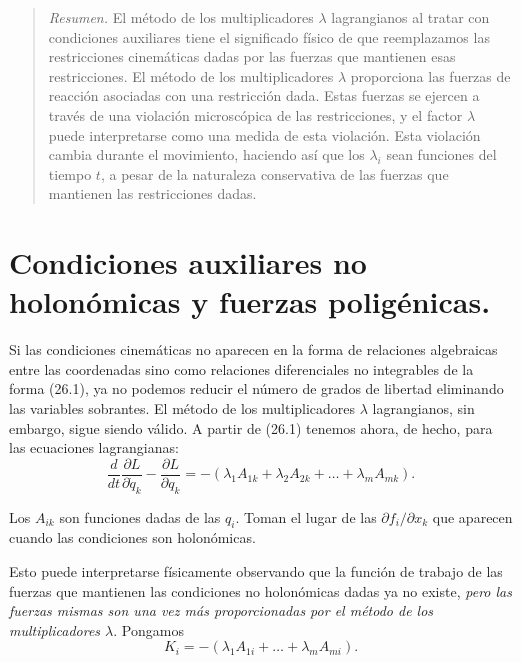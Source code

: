 \documentclass[12pt,a4paper]{book}
\begin{document}
\begin{quote}
\textit{Resumen.} El método de los multiplicadores $\lambda$ lagrangianos al tratar con condiciones auxiliares tiene el significado físico de que reemplazamos las restricciones cinemáticas dadas por las fuerzas que mantienen esas restricciones. El método de los multiplicadores $\lambda$ proporciona las fuerzas de reacción asociadas con una restricción dada. Estas fuerzas se ejercen a través de una violación microscópica de las restricciones, y el factor $\lambda$ puede interpretarse como una medida de esta violación. Esta violación cambia durante el movimiento, haciendo así que los $\lambda_i$ sean funciones del tiempo $t$, a pesar de la naturaleza conservativa de las fuerzas que mantienen las restricciones dadas.
\end{quote}


\section{Condiciones auxiliares no holonómicas y fuerzas poligénicas.}

Si las condiciones cinemáticas no aparecen en la forma de relaciones algebraicas entre las coordenadas sino como relaciones diferenciales no integrables de la forma (26.1), ya no podemos reducir el número de grados de libertad eliminando las variables sobrantes. El método de los multiplicadores $\lambda$ lagrangianos, sin embargo, sigue siendo válido. A partir de (26.1) tenemos ahora, de hecho, para las ecuaciones lagrangianas:
\begin{equation}
\frac{d}{dt}\frac{\partial L}{\partial \dot{q}_k} - \frac{\partial L}{\partial q_k} = -(\lambda_1 A_{1k} + \lambda_2 A_{2k} + \ldots + \lambda_m A_{mk}). \tag{59.1}
\end{equation}

Los $A_{ik}$ son funciones dadas de las $q_i$. Toman el lugar de las $\partial f_i / \partial x_k$ que aparecen cuando las condiciones son holonómicas.

Esto puede interpretarse físicamente observando que la función de trabajo de las fuerzas que mantienen las condiciones no holonómicas dadas ya no existe, \textit{pero las fuerzas mismas son una vez más proporcionadas por el método de los multiplicadores $\lambda$}. Pongamos
\begin{equation}
K_i = -(\lambda_1 A_{1i} + \ldots + \lambda_m A_{mi}). \tag{59.2}
\end{equation}
\end{document}
